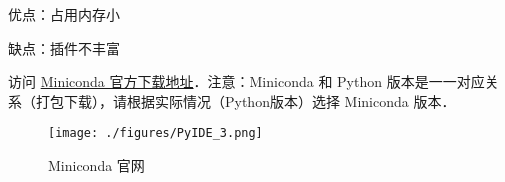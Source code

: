 优点：占用内存小

缺点：插件不丰富

访问 \href{https://docs.conda.io/en/latest/miniconda.html#}{Miniconda 官方下载地址}．注意：Miniconda 和 Python 版本是一一对应关系（打包下载），请根据实际情况（Python版本）选择 Miniconda 版本．

\begin{figure}[ht]
\centering
\texttt{[image: ./figures/PyIDE\_3.png]}
\caption{Miniconda 官网} \label{PyIDE_fig3}
\end{figure}

